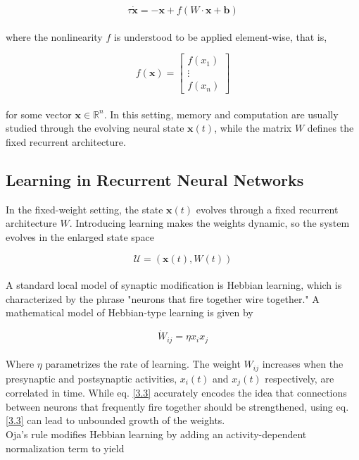 \documentclass[paper=a4, fontsize=11pt]{scrartcl} %
\numberwithin{equation}{section} %
\numberwithin{figure}{section} %
\numberwithin{table}{section} %
\newcommand \bf[1]{\mathbf #1}
\begin{document}
\begin{equation}
\tau \dot{\bf x} = -\bf x+f\left(W \cdot \bf x+\bf b\right)
\end{equation}
\\
where the nonlinearity $f$ is understood to be applied element-wise, that is,

\begin{equation*}
    f(\bf x) = \begin{bmatrix}
    f(x_1) \\ \vdots \\ f(x_n)
    \end{bmatrix}
\end{equation*}
\\
for some vector $\bf x \in \mathbb{R}^n$. In this setting, memory and computation are usually studied through the evolving neural state \(\mathbf{x}(t)\), while the matrix \(W\) defines the fixed recurrent architecture.

\subsection{Learning in Recurrent Neural Networks}
In the fixed-weight setting, the state \({\bf x}(t)\) evolves through a fixed recurrent architecture \(W\). Introducing learning makes the weights dynamic, so the system evolves in the enlarged state space

\[ \mathcal{U} = ({\mathbf x}(t),W(t)) \]
\\
A standard local model of synaptic modification is Hebbian learning, which is characterized by the phrase "neurons that fire together wire together." A mathematical model of Hebbian-type learning is given by

\begin{equation} \label{3.3}
    \dot W_{ij} = \eta x_i x_j
\end{equation}
\\
Where $\eta$ parametrizes the rate of learning. The weight \(W_{ij}\) increases when the presynaptic and postsynaptic activities, $x_i(t)$ and $x_j(t)$ respectively, are correlated in time. While eq. \eqref{3.3} accurately encodes the idea that connections between neurons that frequently fire together should be strengthened, using eq. \eqref{3.3} can lead to unbounded growth of the weights.
\vspace{0.5cm}
\\
Oja's rule modifies Hebbian learning by adding an activity-dependent
normalization term to yield
\end{document}
